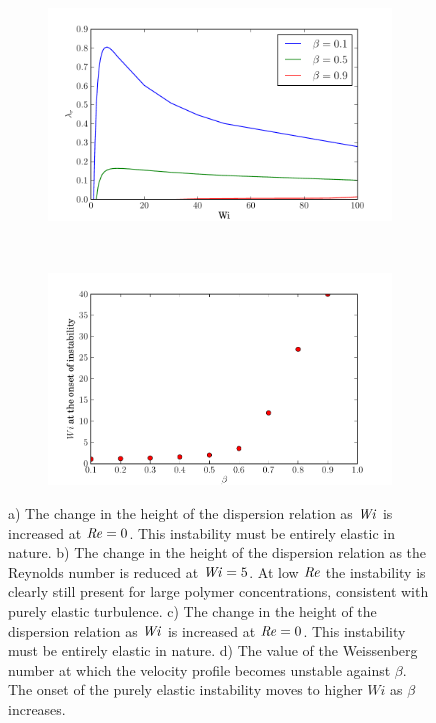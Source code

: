 \documentclass{jfm}
\newcommand\Wi{\mbox{\textit{Wi}}}
\newcommand\Rey{\mbox{\textit{Re}}}  %
\begin{document}
\begin{figure}
\begin{subfigure}[b]{0.48\textwidth}
    \centering
    \includegraphics[width=\textwidth]{KH_low_Re_vary_Wi}
    \caption{ }
    \label{fig:KH_purely_elastic}
\end{subfigure}
~
\begin{subfigure}[b]{0.48\textwidth}
    \centering
    \includegraphics[width=\textwidth]{KH_onset_beta_Wi}
    \caption{}
    \label{fig:KH_elastic_onset}
\end{subfigure}
\caption{a) The change in the height of the dispersion relation as $\Wi$ is increased at $\Rey = 0$. This instability must be entirely elastic in nature. b) The change in the height of the dispersion relation as the Reynolds number is reduced at $\Wi=5$. At low $\Rey$ the instability is clearly still present for large polymer concentrations, consistent with purely elastic turbulence. c) The change in the height of the dispersion relation as $\Wi$ is increased at $\Rey = 0$. This instability must be entirely elastic in nature. d) The value of the Weissenberg number at which the velocity profile becomes unstable against $\beta$. The onset of the purely elastic instability moves to higher $Wi$ as $\beta$ increases.}
\end{figure}
\end{document}

